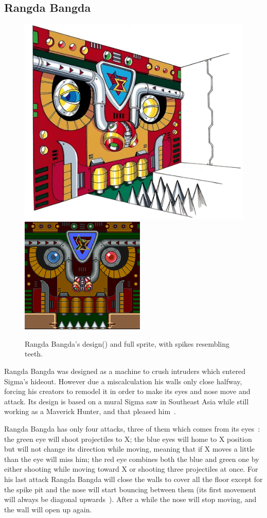 \subsection{Rangda Bangda}\label{boss:Rangda_bangda}
\begin{figure}[htp]
	\centering
	\includegraphics[width=0.4\linewidth]{figures/X1/Sigma_stages/RangdaBangda.jpg}
	\includegraphics[width=0.35\linewidth]{figures/X1/Sigma_stages/Rangdabangdasprite.png}
	\caption{Rangda Bangda's design(\cite{book:MMX_Complete_art}) and full sprite, with spikes resembling teeth.}
\end{figure}
Rangda Bangda was designed as a machine to crush intruders which entered Sigma's hideout. However due a miscalculation his walls only close halfway, forcing his creators to remodel it in order to make its eyes and nose move and attack. Its design is based on a mural Sigma saw in Southeast Asia while still working as a Maverick Hunter, and that pleased him~\cite{wayback:X_resources}.

Rangda Bangda has only four attacks, three of them which comes from its eyes~\cite{wiki:Rangda_bangda}: the green eye will shoot projectiles to X; the blue eyes will home to X position but will not change its direction while moving, meaning that if X moves a little than the eye will miss him; the red eye combines both the blue and green one by either shooting while moving toward X or shooting three projectiles at once. For his last attack Rangda Bangda will close the walls to cover all the floor except for the spike pit and the nose will start bouncing between them (its first movement will always be diagonal upwards~\cite{stratwiki:Sigma_stage_2}). After a while the nose will stop moving, and the wall will open up again.


